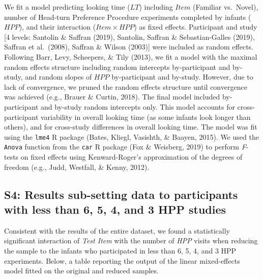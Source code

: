 \begin{appendix}
We fit a model predicting looking time (\(LT\)) including \(Item\)
(Familiar vs.~Novel), number of Head-turn Preference Procedure
experiments completed by infants (\(HPP\)), and their interaction
(\(Item \times HPP\)) as fixed effects. Participant and study {[}4
levels: Santolin \& Saffran (2019), Santolin, Saffran \&
Sebastian-Galles (2019), Saffran et al.~(2008), Saffran \& Wilson
(2003){]} were included as random effects. Following Barr, Levy,
Scheepers, \& Tily (2013), we fit a model with the maximal random
effects structure including random intercepts by-participant and
by-study, and random slopes of \(HPP\) by-participant and by-study.
However, due to lack of convergence, we pruned the random effects
structure until convergence was achieved (e.g., Brauer \& Curtin, 2018).
The final model included by-participant and by-study random intercepts
only. This model accounts for cross-participant variability in overall
looking time (as some infants look longer than others), and for
cross-study differences in overall looking time. The model was fit using
the \texttt{lme4} R package (Bates, Kliegl, Vasishth, \& Baayen, 2015).
We used the \texttt{Anova} function from the \texttt{car} R package (Fox
\& Weisberg, 2019) to perform \emph{F}-tests on fixed effects using
Kenward-Roger's approximation of the degrees of freedom (e.g., Judd,
Westfall, \& Kenny, 2012).

\hypertarget{s4}{%
\subsection{S4: Results sub-setting data to participants with less than
6, 5, 4, and 3 HPP studies}\label{s4}}

Consistent with the results of the entire dataset, we found a
statistically significant interaction of \emph{Test Item} with the
number of \emph{HPP} visits when reducing the sample to the infants who
participated in less than 6, 5, 4, and 3 HPP experiments. Below, a table
reporting the output of the linear mixed-effects model fitted on the
original and reduced samples.


\end{appendix}
